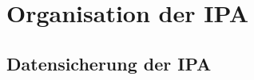 \chapter{Organisation der IPA}
\begin{comment}
    Wie wird die Dokumentablage organisiert? Mit Printscreen oder Schema aufzeigen.
    Arbeitsplatz: wo? wie eingerichtet? fehlte etwas? (ev. ein Bild vom Arbeitsplatz machen).
    Strukturablage: Ordner und Versionisierung wichtig! Wird ein Tool wie beispielsweise SVN oder GiT verwendet, muss gemäss Kriterium ein Printscreen erstellt werden. Am besten am Schluss mit allen Versionen.
\end{comment}

\section{Datensicherung der IPA}
\begin{comment}
    Wie/wann/wo werden die Daten gesichert?
    Achtung: Auf DROPBOX und andere Cloudsysteme, welche nicht in der Schweiz beheimatet sind, sollten aus Informations- und Datenschutzgründen keine Daten gesichert werden!
    ISDS-Konzept!!!
    Beschreiben, wie der Kandidat die IPA und die erarbeitete Dokumente sichert.
    Auch auf einen USB-Stick kann gesichert werden!
\end{comment}

